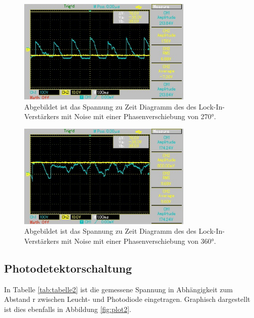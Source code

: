 \begin{figure}[H]
  \centering
  \includegraphics[height=5cm]{Bilder/n_phi270.jpg}
  \caption{Abgebildet ist das Spannung zu Zeit Diagramm des des Lock-In-Verstärkers mit Noise mit einer Phasenverschiebung von 270°.}
  \label{fig:n_phi270}
\end{figure}

\begin{figure}[H]
  \centering
  \includegraphics[height=5cm]{Bilder/n_phi360.jpg}
  \caption{Abgebildet ist das Spannung zu Zeit Diagramm des des Lock-In-Verstärkers mit Noise mit einer Phasenverschiebung von 360°.}
  \label{fig:n_phi360}
\end{figure}

\subsection{Photodetektorschaltung}
In Tabelle \ref{tab:tabelle2} ist die gemessene Spannung in Abhängigkeit zum Abstand r zwischen Leucht- und Photodiode eingetragen.
Graphisch dargestellt ist dies ebenfalls in Abbildung \ref{fig:plot2}.

